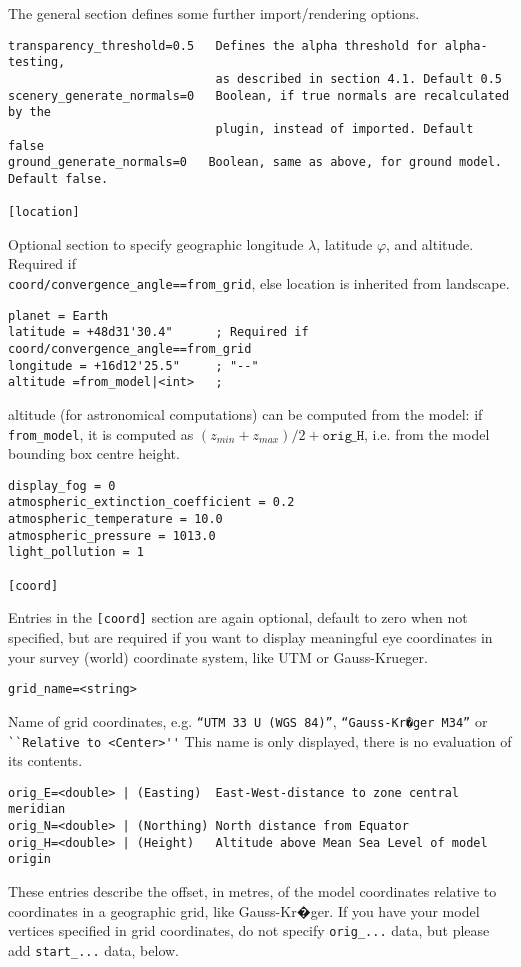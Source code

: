 \documentclass[a4paper]{article}
\begin{document}
The general section defines some further import/rendering options.
\begin{verbatim}
transparency_threshold=0.5   Defines the alpha threshold for alpha-testing, 
                             as described in section 4.1. Default 0.5
scenery_generate_normals=0   Boolean, if true normals are recalculated by the
                             plugin, instead of imported. Default false
ground_generate_normals=0   Boolean, same as above, for ground model. Default false.

[location]
\end{verbatim}
Optional section to specify geographic longitude $\lambda$, latitude
$\varphi$, and altitude. Required if\\
\verb|coord/convergence_angle==from_grid|, else location is inherited
from landscape.
\begin{verbatim}
planet = Earth
latitude = +48d31'30.4"      ; Required if coord/convergence_angle==from_grid
longitude = +16d12'25.5"     ; "--"
altitude =from_model|<int>   ; 
\end{verbatim}
altitude (for astronomical computations) can be computed from the
model:  if \verb|from_model|, it is computed as $(z_{min}+z_{max})/2+\mathtt{orig\_H}$,
i.e. from the model bounding box centre height.

\begin{verbatim}
display_fog = 0
atmospheric_extinction_coefficient = 0.2
atmospheric_temperature = 10.0
atmospheric_pressure = 1013.0
light_pollution = 1

[coord]
\end{verbatim}

Entries in the \verb|[coord]| section are again optional, default to zero when not specified, but are
required if you want to display meaningful eye coordinates in your
survey (world) coordinate system, like UTM or Gauss-Krueger.  

\begin{verbatim}
grid_name=<string> 
\end{verbatim}
Name of grid coordinates, e.g. \texttt{``UTM 33 U (WGS 84)''}, \texttt{``Gauss-Kr�ger M34''} or \verb|``Relative to <Center>''| 
                       This name is only displayed, there is no evaluation of its contents.

\begin{verbatim}
orig_E=<double> | (Easting)  East-West-distance to zone central meridian
orig_N=<double> | (Northing) North distance from Equator
orig_H=<double> | (Height)   Altitude above Mean Sea Level of model origin
\end{verbatim}
These entries describe the offset, in metres, of the model coordinates relative to coordinates in a geographic grid, like Gauss-Kr�ger.
If you have your model vertices specified in grid coordinates, do not specify \verb|orig_...| data, 
but please add \verb|start_...| data, below. 
\end{document}
